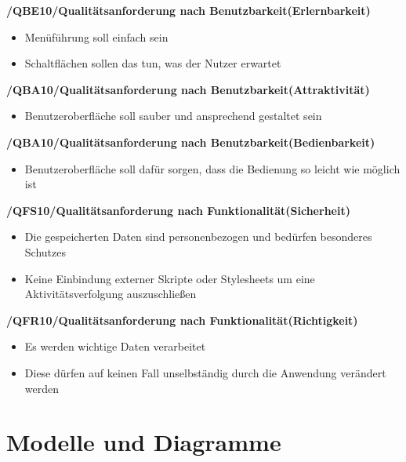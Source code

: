 \documentclass[12pt, a4paper]{scrartcl}
\newcommand{\ford}[2]{\textbf{/#1/\hspace{2em}#2}}
\begin{document}
\ford{QBE10}{Qualitätsanforderung nach Benutzbarkeit(Erlernbarkeit)}
\begin{itemize}
	\item Menüführung soll einfach sein
	\item Schaltflächen sollen das tun, was der Nutzer erwartet
\end{itemize}

\ford{QBA10}{Qualitätsanforderung nach Benutzbarkeit(Attraktivität)}
\begin{itemize}
	\item Benutzeroberfläche soll sauber und ansprechend gestaltet sein
\end{itemize}

\ford{QBA10}{Qualitätsanforderung nach Benutzbarkeit(Bedienbarkeit)}
\begin{itemize}
	\item Benutzeroberfläche soll dafür sorgen, dass die Bedienung so leicht wie möglich ist
\end{itemize}

\ford{QFS10}{Qualitätsanforderung nach Funktionalität(Sicherheit)}
\begin{itemize}
	\item Die gespeicherten Daten sind personenbezogen und bedürfen besonderes Schutzes
	\item Keine Einbindung externer Skripte oder Stylesheets um eine Aktivitätsverfolgung auszuschließen
\end{itemize}

\ford{QFR10}{Qualitätsanforderung nach Funktionalität(Richtigkeit)}
\begin{itemize}
	\item Es werden wichtige Daten verarbeitet
	\item Diese dürfen auf keinen Fall unselbständig durch die Anwendung verändert werden
\end{itemize}
\newpage


\section{Modelle und Diagramme}
\end{document}
